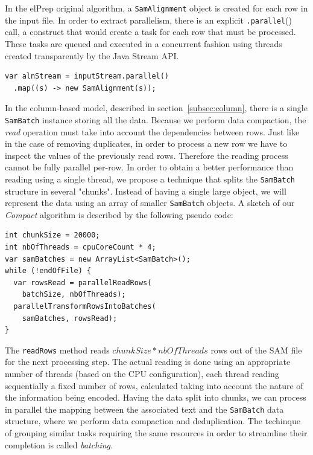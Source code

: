 \documentclass[a4paper,twoside]{article}
\begin{document}
In the elPrep original algorithm, a {\texttt{SamAlignment}} object is created for each row in the input file.
In order to extract parallelism, there is an explicit {\texttt{.parallel}()} call, a construct that would create a task for each row that must be processed.
These tasks are queued and executed in a concurrent fashion using threads created transparently by the Java Stream API.
\begin{verbatim}
var alnStream = inputStream.parallel()
  .map((s) -> new SamAlignment(s));
\end{verbatim}
In the column-based model, described in section~\ref{subsec:column}, there is a single {\texttt{SamBatch}} instance storing all the data.
Because we perform data compaction, the {\textit{read}} operation must take into account the dependencies between rows.
Just like in the case of removing duplicates, in order to process a new row we have to inspect the values of the previously read rows.
Therefore the reading process cannot be fully parallel per-row.
In order to obtain a better performance than reading using a single thread, we propose a technique that splits the {\texttt{SamBatch}} structure in several "chunks".
Instead of having a single large object, we will represent the data using an array of smaller {\texttt{SamBatch}} objects.
A sketch of our {\textit{Compact}} algorithm is described by the following pseudo code:

\begin{verbatim}
int chunkSize = 20000;
int nbOfThreads = cpuCoreCount * 4;
var samBatches = new ArrayList<SamBatch>();
while (!endOfFile) {
  var rowsRead = parallelReadRows(
    batchSize, nbOfThreads);
  parallelTransformRowsIntoBatches(
    samBatches, rowsRead);
}
\end{verbatim}

The {\texttt{readRows}} method reads $chunkSize * nbOfThreads$ rows out of the SAM file for the next processing step.
The actual reading is done using an appropriate number of threads (based on the CPU configuration), each thread reading sequentially a fixed number of rows, calculated taking into account the nature of the information being encoded.
Having the data split into chunks, we can process in parallel the mapping between the associated text and the {\texttt{SamBatch}} data structure, where we perform data compaction and deduplication.
The techinque of grouping similar tasks requiring the same resources in order to streamline their completion is called {\textit{batching}}.
\end{document}
